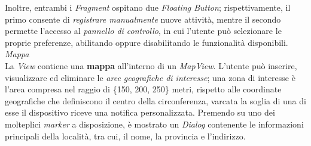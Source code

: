 \documentclass{article}
\begin{document}
    Inoltre, entrambi i \textit{Fragment} ospitano due \textit{Floating Button}; rispettivamente, il primo consente di \textit{registrare manualmente} nuove attività,
    mentre il secondo permette l'accesso al \textit{pannello di controllo}, in cui l'utente può selezionare le proprie preferenze, abilitando oppure disabilitando le funzionalità disponibili. \vspace*{7pt}\\
    \textit{Mappa} \vspace*{7pt}\\
    La \textit{View} contiene una \textbf{mappa} all'interno di un \textit{MapView}. L'utente può inserire, visualizzare ed eliminare le \textit{aree geografiche di interesse};
    una zona di interesse è l'area compresa nel raggio di \{150, 200, 250\} metri, rispetto alle coordinate geografiche che definiscono il centro della circonferenza, varcata
    la soglia di una di esse il dispositivo riceve una notifica personalizzata. 
    Premendo su uno dei molteplici \textit{marker} a disposizione, è mostrato un \textit{Dialog} contenente le informazioni principali della località, tra cui, il nome, la provincia
    e l'indirizzo. 
\end{document}
